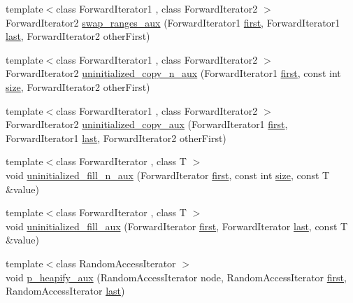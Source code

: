 \begin{DoxyCompactItemize}
\item 
{\footnotesize template$<$class Forward\+Iterator1 , class Forward\+Iterator2 $>$ }\\Forward\+Iterator2 \hyperlink{namespaceprism_a7ca4ae3ad4c2e21d6fe48b6fae6930c3}{swap\+\_\+ranges\+\_\+aux} (Forward\+Iterator1 \hyperlink{namespaceprism_ae3fb7a1926a9e8e59300cd5e370470da}{first}, Forward\+Iterator1 \hyperlink{namespaceprism_abe4956c4e865f55ca126b7fb973b5078}{last}, Forward\+Iterator2 other\+First)
\item 
{\footnotesize template$<$class Forward\+Iterator1 , class Forward\+Iterator2 $>$ }\\Forward\+Iterator2 \hyperlink{namespaceprism_a85d1fe2d10e98f9de7aec30799f2eec0}{uninitialized\+\_\+copy\+\_\+n\+\_\+aux} (Forward\+Iterator1 \hyperlink{namespaceprism_ae3fb7a1926a9e8e59300cd5e370470da}{first}, const int \hyperlink{namespaceprism_acd3c0f96adf158a29387191d79c4d874}{size}, Forward\+Iterator2 other\+First)
\item 
{\footnotesize template$<$class Forward\+Iterator1 , class Forward\+Iterator2 $>$ }\\Forward\+Iterator2 \hyperlink{namespaceprism_a6ef07b731fbaecb8abe1ad8faabaab1e}{uninitialized\+\_\+copy\+\_\+aux} (Forward\+Iterator1 \hyperlink{namespaceprism_ae3fb7a1926a9e8e59300cd5e370470da}{first}, Forward\+Iterator1 \hyperlink{namespaceprism_abe4956c4e865f55ca126b7fb973b5078}{last}, Forward\+Iterator2 other\+First)
\item 
{\footnotesize template$<$class Forward\+Iterator , class T $>$ }\\void \hyperlink{namespaceprism_aa02596d3361c57f312168ffac621e421}{uninitialized\+\_\+fill\+\_\+n\+\_\+aux} (Forward\+Iterator \hyperlink{namespaceprism_ae3fb7a1926a9e8e59300cd5e370470da}{first}, const int \hyperlink{namespaceprism_acd3c0f96adf158a29387191d79c4d874}{size}, const T \&value)
\item 
{\footnotesize template$<$class Forward\+Iterator , class T $>$ }\\void \hyperlink{namespaceprism_aaa8fcd4a3943bfa624f77fc8f3af5916}{uninitialized\+\_\+fill\+\_\+aux} (Forward\+Iterator \hyperlink{namespaceprism_ae3fb7a1926a9e8e59300cd5e370470da}{first}, Forward\+Iterator \hyperlink{namespaceprism_abe4956c4e865f55ca126b7fb973b5078}{last}, const T \&value)
\item 
{\footnotesize template$<$class Random\+Access\+Iterator $>$ }\\void \hyperlink{namespaceprism_a95d95c728950cef3542d8b1dd27eb344}{p\+\_\+heapify\+\_\+aux} (Random\+Access\+Iterator node, Random\+Access\+Iterator \hyperlink{namespaceprism_ae3fb7a1926a9e8e59300cd5e370470da}{first}, Random\+Access\+Iterator \hyperlink{namespaceprism_abe4956c4e865f55ca126b7fb973b5078}{last})

\end{DoxyCompactItemize}
